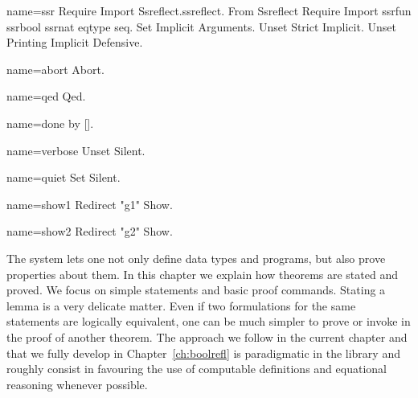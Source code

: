 \begin{coqdef}{name=ssr}
Require Import Ssreflect.ssreflect.
From Ssreflect Require Import ssrfun ssrbool ssrnat eqtype seq.
Set Implicit Arguments.
Unset Strict Implicit.
Unset Printing Implicit Defensive.
\end{coqdef}
\begin{coqdef}{name=abort}
Abort.
\end{coqdef}
\begin{coqdef}{name=qed}
Qed.
\end{coqdef}
\begin{coqdef}{name=done}
by [].
\end{coqdef}
\begin{coqdef}{name=verbose}
Unset Silent.
\end{coqdef}
\begin{coqdef}{name=quiet}
Set Silent.
\end{coqdef}
\begin{coqdef}{name=show1}
Redirect "g1" Show.
\end{coqdef}
\begin{coqdef}{name=show2}
Redirect "g2" Show.
\end{coqdef}

\label{ch:proofs}
The \Coq{} system lets one not only define data types and programs, but
also prove properties about them.  In this chapter we explain how
theorems are stated and proved.  We focus on simple statements and
basic proof commands.  Stating a lemma is a very delicate matter.  Even if two
formulations for the same statements are logically equivalent, one can be much
simpler to prove or invoke in the proof of another theorem.
The approach we follow in the current chapter and that we
fully develop in Chapter~\ref{ch:boolrefl} is paradigmatic in the
\mcbMC{} library and roughly consist in favouring the use of computable
definitions and equational reasoning whenever possible.


